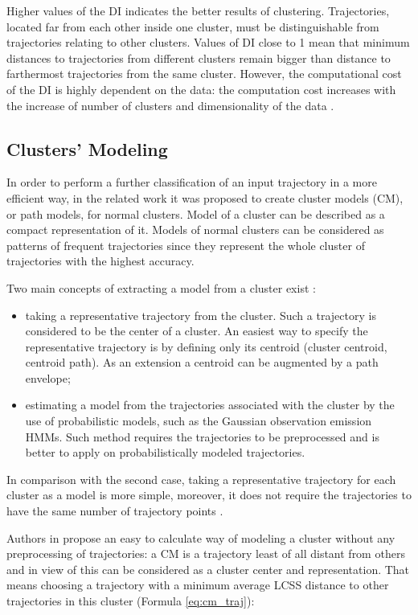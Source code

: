 Higher values of the DI indicates the better results of clustering. Trajectories, located far from each other inside one cluster, must be distinguishable from trajectories relating to other clusters. Values of DI close to 1 mean that minimum distances to trajectories from different clusters remain bigger than distance to farthermost trajectories from the same cluster. However, the computational cost of the DI is highly dependent on the data: the computation cost increases with the increase of number of clusters and dimensionality of the data \cite{online:dunn_cl_valid}.

\subsection{Clusters' Modeling}

In order to perform a further classification of an input trajectory in a more efficient way, in the related work it was proposed to create cluster models (CM), or path models, for normal clusters. Model of a cluster can be described as a compact representation of it. Models of normal clusters can be considered as patterns of frequent trajectories since they represent the whole cluster of trajectories with the highest accuracy. 

Two main concepts of extracting a model from a cluster exist \cite{article:surv_cl_models}:

\begin{itemize}
	\setlength\itemsep{0em}
	\item taking a representative trajectory from the cluster. Such a trajectory is considered to be the center of a cluster. An easiest way to specify the representative trajectory is by defining only its centroid (cluster centroid, centroid path). As an extension a centroid can be augmented by a path envelope;
	\item estimating a model from the trajectories associated with the cluster by the use of probabilistic models, such as the Gaussian observation emission HMMs. Such method requires the trajectories to be preprocessed and is better to apply on probabilistically modeled trajectories.
\end{itemize}

In comparison with the second case, taking a representative trajectory for each cluster as a model is more simple, moreover, it does not require the trajectories to have the same number of trajectory points \cite{inproceedings:7_related_work}.

Authors in \cite{inproceedings:7_related_work} propose an easy to calculate way of modeling a cluster without any preprocessing of trajectories: a CM is a trajectory least of all distant from others and in view of this can be considered as a cluster center and representation. That means choosing a trajectory with a minimum average LCSS distance to other trajectories in this cluster (Formula \ref{eq:cm_traj}):

